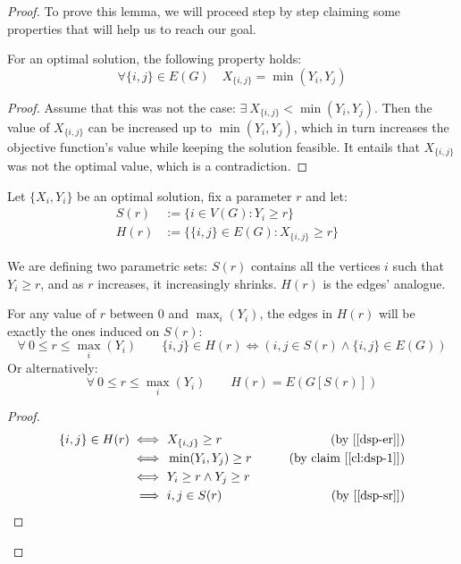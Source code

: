 \begin{proof}
    To prove this lemma, we will proceed step by step claiming some properties that will help us to reach our goal.
    
    \begin{claim}\label{cl:dsp-1}
        For an optimal solution, the following property holds:
        \[
            \forall \{i, j\} \in E(G) \quad X_{\{i, j\}} = \min(Y_i, Y_j)
        \]
    \end{claim}
    \begin{proof}
        Assume that this was not the case: $\exists\ X_{\{i, j\}} < \min(Y_i, Y_j)$. Then the value of $X_{\{i, j\}}$ can be increased up to $\min(Y_i, Y_j)$, which in turn increases the objective function's value while keeping the solution feasible. It entails that $X_{\{i, j\}}$ was not the optimal value, which is a contradiction.
    \end{proof}

    Let $\{X_i, Y_i\}$ be an optimal solution, fix a parameter $r$ and let:
    \begin{align}
        S(r) &:= \{ i \in V(G) : Y_i \geq r\}                   & \label{dsp-sr} \\
        H(r) &:= \{ \{i, j\} \in E(G) : X_{\{i, j\}} \geq r\}   & \label{dsp-er}
    \end{align}

    We are defining two parametric sets: $S(r)$ contains all the vertices $i$ such that $Y_i \geq r$, and as $r$ increases, it increasingly shrinks. $H(r)$ is the edges' analogue.
    
    \begin{claim}\label{cl:dsp-2}
        For any value of $r$ between $0$ and $\max_i(Y_i)$, the edges in $H(r)$ will be exactly the ones induced on $S(r)$:
        \[
            \forall\ 0 \leq r \leq \max_i(Y_i) \qquad \{i, j\} \in H(r) \iff (i, j \in S(r) \wedge \{i, j\} \in E(G))
        \]
        Or alternatively:
        \[
            \forall\ 0 \leq r \leq \max_i(Y_i) \qquad H(r) = E(G[S(r)])
        \]
    \end{claim}

    \begin{proof}
        \begin{align*}
                       \{i, j\} \in H(r) 
            \iff&\     X_{\{i, j\}} \geq r          & \tag{by [\ref{dsp-er}]} \\
            \iff&\     \min(Y_i, Y_j) \geq r        & \tag{by claim [\ref{cl:dsp-1}]} \\
            \iff&\     Y_i \geq r \wedge Y_j \geq r & \\
            \implies&\ i, j \in S(r)                & \tag{by [\ref{dsp-sr}]}
        \end{align*}


\end{proof}
\end{proof}
